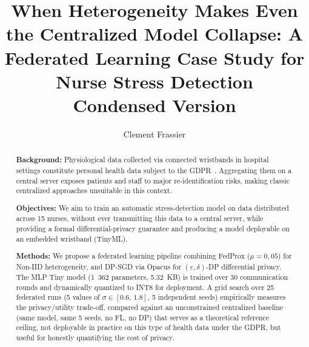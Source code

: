 \documentclass{acmart}
\begin{document}
\title[Extreme Heterogeneity in FL: Centralized Collapses Too]{When Heterogeneity Makes Even the Centralized Model Collapse: A Federated Learning Case Study for Nurse Stress Detection \\ \large Condensed Version}

\author{Clement Frassier}

\begin{abstract}
{\bf Background:}
Physiological data collected via connected wristbands in hospital settings constitute
personal health data subject to the GDPR~\cite{gdpr2016}. Aggregating them on a
central server exposes patients and staff to major re-identification risks, making
classic centralized approaches unsuitable in this context.

{\bf Objectives:}
We aim to train an automatic stress-detection model on data distributed across 15
nurses, without ever transmitting this data to a central server, while providing a
formal differential-privacy guarantee and producing a model deployable on an embedded
wristband (TinyML).

{\bf Methods:}
We propose a federated learning pipeline combining FedProx ($\mu = 0{,}05$) for
Non-IID heterogeneity, and DP-SGD via Opacus for $(\varepsilon, \delta)$-DP
differential privacy. The MLP Tiny model (1~362 parameters, 5.32~KB) is trained over
30 communication rounds and dynamically quantized to INT8 for deployment. A grid
search over 25 federated runs (5 values of $\sigma \in [0.6,\, 1.8]$, 5 independent
seeds) empirically measures the privacy/utility trade-off, compared against an
unconstrained centralized baseline (same model, same 5 seeds, no FL, no DP) that
serves as a theoretical reference ceiling, not deployable in practice on this type of
health data under the GDPR, but useful for honestly quantifying the cost of privacy.


\end{abstract}
\end{document}
